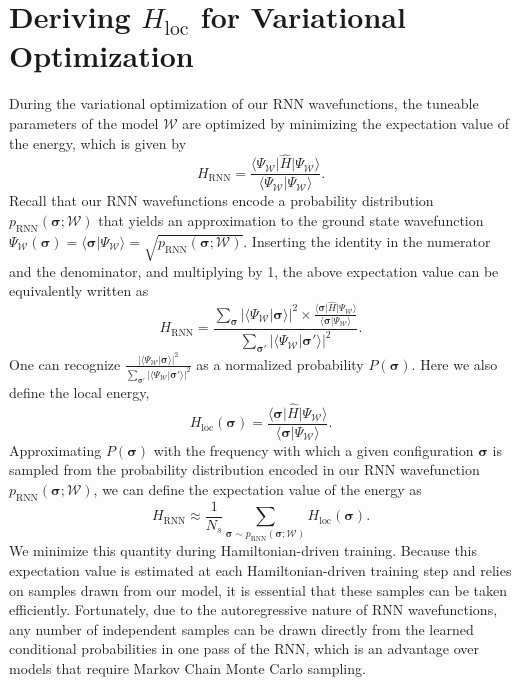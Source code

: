 \documentclass[twocolumn,
                showpacs,
                nofootinbib,
                nobibnotes,
                aps,
                superscriptaddress,
                amssymb,
                amsmath,
                floatfix,
                reprint,
                prx, 
                notitlepage,
                showkeys,
                10pt,
		]{revtex4-2}
\begin{document}
\section{Deriving $H_\text{loc}$ for Variational Optimization}\label{app:vmc}
During the variational optimization of our RNN wavefunctions, the tuneable parameters of the model $\mathcal{W}$ are optimized by minimizing the expectation value of the energy, which is given by
\begin{equation*}
    H_{\text{RNN}} = \frac{\langle \Psi_{\mathcal{W}}\vert \hat{H}\vert \Psi_{\mathcal{W}}\rangle}{\langle \Psi_{\mathcal{W}}\vert \Psi_{\mathcal{W}}\rangle}.
\end{equation*}
Recall that our RNN wavefunctions encode a probability distribution $p_{\text{RNN}}(\boldsymbol\sigma;\mathcal{W})$ that yields an approximation to the ground state wavefunction 
$\Psi_{\mathcal{W}}(\boldsymbol\sigma) = \langle \boldsymbol\sigma\vert\Psi_{\mathcal{W}}\rangle = \sqrt{p_{\text{RNN}}(\boldsymbol\sigma;\mathcal{W})}$.
Inserting the identity in the numerator and the denominator, and multiplying by 1, the above expectation value can be equivalently written as
\begin{equation*}
    H_{\text{RNN}} = \frac{\sum_{\boldsymbol\sigma} \vert\langle \Psi_{\mathcal{W}}\vert\boldsymbol\sigma\rangle\vert^2 \times \frac{\langle \boldsymbol\sigma\vert \hat{H}\vert \Psi_{\mathcal{W}}\rangle}{\langle \boldsymbol\sigma\vert \Psi_{\mathcal{W}}\rangle}}{\sum_{\boldsymbol\sigma\prime} \vert\langle \Psi_{\mathcal{W}}\vert\boldsymbol\sigma\prime \rangle \vert^2 }.
\end{equation*}
One can recognize 
$\frac{\vert\langle \Psi_{\mathcal{W}}\vert\boldsymbol\sigma\rangle\vert^2}{\sum_{\boldsymbol\sigma\prime} \vert\langle \Psi_{\mathcal{W}}\vert\boldsymbol\sigma\prime \rangle \vert^2}$
as a normalized probability $P(\boldsymbol\sigma)$. 
Here we also define the local energy,
\begin{equation*}
    H_{\text{loc}}(\boldsymbol\sigma) = \frac{\langle \boldsymbol\sigma\vert \hat{H}\vert \Psi_{\mathcal{W}}\rangle}{\langle \boldsymbol\sigma\vert \Psi_{\mathcal{W}}\rangle}.
\end{equation*}
Approximating $P(\boldsymbol{\sigma})$ with the frequency with which a given configuration $\boldsymbol\sigma$ is sampled from the probability distribution encoded in our RNN wavefunction $p_{\text{RNN}}(\boldsymbol\sigma;\mathcal{W})$, we can define the expectation value of the energy as
\begin{equation*}
    H_{\text{RNN}} \approx \frac{1}{N_s}\sum_{\boldsymbol\sigma\sim p_{\text{RNN}}(\boldsymbol\sigma;\mathcal{W})} H_{\text{loc}}(\boldsymbol\sigma).
\end{equation*}
We minimize this quantity during Hamiltonian-driven training.
Because this expectation value is estimated at each Hamiltonian-driven training step and relies on samples drawn from our model, it is essential that these samples can be taken efficiently. Fortunately, due to the autoregressive nature of RNN wavefunctions, any number of independent samples can be drawn directly from the learned conditional probabilities in one pass of the RNN, which is an advantage over models that require Markov Chain Monte Carlo sampling. 
\end{document}
